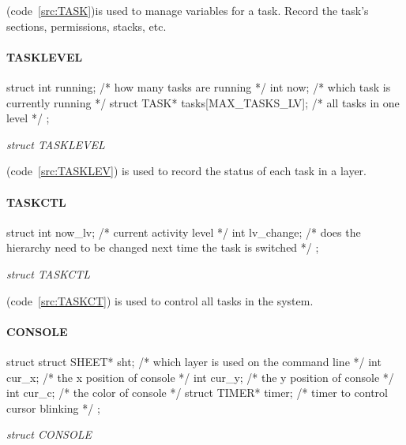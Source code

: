 \documentclass{swfcthesis}
\begin{document}
(code~\ref{src:TASK})is used to manage variables for a task. Record the task's sections,
permissions, stacks, etc.


\paragraph{TASKLEVEL}

\begin{listing}[H]
  \begin{codeblock}
\begin{ccode}
struct 
{ 
  int running;                      /* how many tasks are running */
  int now;                          /* which task is currently running */
  struct TASK* tasks[MAX_TASKS_LV]; /* all tasks in one level */
};
\end{ccode}
  \end{codeblock}
  \caption{\emph{struct TASKLEVEL}}\label{src:TASKLEV}
\end{listing}

(code~\ref{src:TASKLEV}) is used to record the status of each task in a layer.


\paragraph{TASKCTL}

\begin{listing}[H]
  \begin{codeblock}
\begin{ccode}
struct 
{ 
  int now_lv;    /* current activity level */
  int lv_change; /* does the hierarchy need to be changed next time the task is switched */
};
\end{ccode}
  \end{codeblock}
  \caption{\emph{struct TASKCTL}}\label{src:TASKCT}
\end{listing}

(code~\ref{src:TASKCT}) is used to control all tasks in the system.



\paragraph{CONSOLE}

\begin{listing}[H]
  \begin{codeblock}
\begin{ccode}
struct 
{ 
  struct SHEET* sht;   /* which layer is used on the command line */
  int cur_x;           /* the x position of console */
  int cur_y;           /* the y position of console */
  int cur_c;           /* the color of console */
  struct TIMER* timer; /* timer to control cursor blinking */
};
\end{ccode}
  \end{codeblock}
  \caption{\emph{struct CONSOLE}}\label{src:CONSOLE}
\end{listing}
\end{document}
